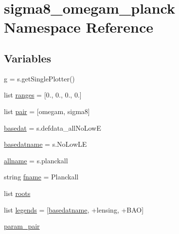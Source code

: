 \hypertarget{namespacesigma8__omegam__planck}{}\section{sigma8\+\_\+omegam\+\_\+planck Namespace Reference}
\label{namespacesigma8__omegam__planck}
\subsection*{Variables}
\begin{DoxyCompactItemize}
\item 
\mbox{\hyperlink{namespacesigma8__omegam__planck_acc0c9de38ea32c5f3a28f03e712a1268}{g}} = s.\+get\+Single\+Plotter()
\item 
list \mbox{\hyperlink{namespacesigma8__omegam__planck_af34775c567c1ed8f5cac998a01ef5318}{ranges}} = \mbox{[}0., 0., 0., 0.\mbox{]}
\item 
list \mbox{\hyperlink{namespacesigma8__omegam__planck_a7ad4d41cb95712367bc3e8d0ccbc346a}{pair}} = \mbox{[}\textquotesingle{}omegam\textquotesingle{}, \textquotesingle{}sigma8\textquotesingle{}\mbox{]}
\item 
\mbox{\hyperlink{namespacesigma8__omegam__planck_ae7691be2d7f3074af27b562f5d23068e}{basedat}} = s.\+defdata\+\_\+all\+No\+LowE
\item 
\mbox{\hyperlink{namespacesigma8__omegam__planck_ab2cfd0b2088c26d22dd413b565cae11f}{basedatname}} = s.\+No\+Low\+LE
\item 
\mbox{\hyperlink{namespacesigma8__omegam__planck_af3d6d2eba03d3165b6cdfa9dda9003a3}{allname}} = s.\+planckall
\item 
string \mbox{\hyperlink{namespacesigma8__omegam__planck_ad2993ff5a506a824c606201fb7e453a9}{fname}} = \textquotesingle{}Planckall\textquotesingle{}
\item 
list \mbox{\hyperlink{namespacesigma8__omegam__planck_a3beb52e6133173b1edfa9b6f5d894623}{roots}}
\item 
list \mbox{\hyperlink{namespacesigma8__omegam__planck_a9c89f4c74d28139d96d12344704d608c}{legends}} = \mbox{[}\mbox{\hyperlink{namespacesigma8__omegam__planck_ab2cfd0b2088c26d22dd413b565cae11f}{basedatname}}, \textquotesingle{}+lensing\textquotesingle{}, \textquotesingle{}+B\+AO\textquotesingle{}\mbox{]}
\item 
\mbox{\hyperlink{namespacesigma8__omegam__planck_afda816b407438141d37a9bc3517457a4}{param\+\_\+pair}}
\item 

\end{DoxyCompactItemize}
